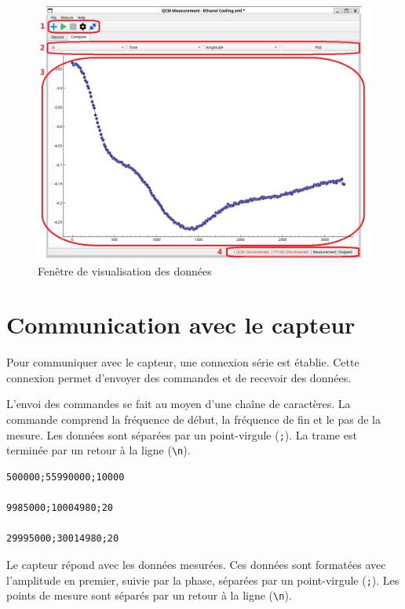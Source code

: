 \begin{figure}[H]
    \centering
    \includegraphics[width=\textwidth]{assets/figures/Plot_window_.png}
    \caption{Fenêtre de visualisation des données}
    \label{fig:plot window}
\end{figure}

\section{Communication avec le capteur}

Pour communiquer avec le capteur, une connexion série est établie. Cette connexion permet d'envoyer des commandes et de recevoir des données.

L’envoi des commandes se fait au moyen d’une chaîne de caractères. La commande comprend la fréquence de début, la fréquence de fin et le pas de la mesure. Les données sont séparées par un point-virgule (\texttt{;}). La trame est terminée par un retour à la ligne (\texttt{\textbackslash n}).

\begin{verbatim}
500000;55990000;10000

9985000;10004980;20

29995000;30014980;20
\end{verbatim}

Le capteur répond avec les données mesurées. Ces données sont formatées avec l'amplitude en premier, suivie par la phase, séparées par un point-virgule (\texttt{;}). Les points de mesure sont séparés par un retour à la ligne (\texttt{\textbackslash n}).

